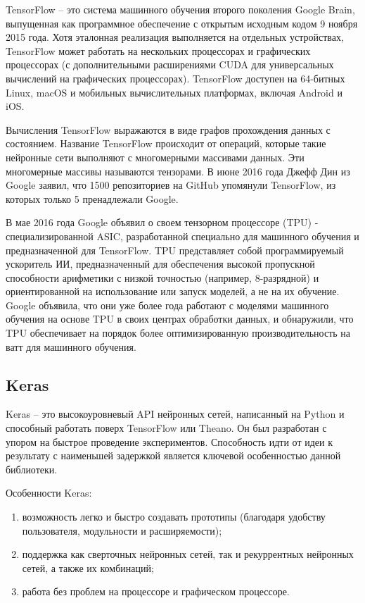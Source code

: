 TensorFlow -- это система машинного обучения второго поколения \linebreak Google Brain, выпущенная как программное обеспечение с открытым исходным кодом 9 ноября 2015 года. Хотя эталонная реализация выполняется на отдельных устройствах, TensorFlow может работать на нескольких процессорах и графических процессорах (с дополнительными расширениями CUDA для универсальных вычислений на графических процессорах). TensorFlow доступен на 64-битных Linux, macOS и мобильных вычислительных платформах, включая Android и iOS.

Вычисления TensorFlow выражаются в виде графов прохождения данных с состоянием. Название TensorFlow происходит от операций, которые такие нейронные сети выполняют с многомерными массивами данных. Эти многомерные массивы называются тензорами. В июне 2016 года Джефф Дин из Google заявил, что 1500 репозиториев на GitHub упомянули TensorFlow, из которых только 5 пренадлежали Google.

В мае 2016 года Google объявил о своем тензорном процессоре (TPU) - специализированной ASIC, разработанной специально для машинного обучения и предназначенной для TensorFlow. TPU представляет собой программируемый ускоритель ИИ, предназначенный для обеспечения высокой пропускной способности арифметики с низкой точностью (например, 8-разрядной) и ориентированной на использование или запуск моделей, а не на их обучение. Google объявила, что они уже более года работают с моделями машинного обучения на основе TPU в своих центрах обработки данных, и обнаружили, что TPU обеспечивает на порядок более оптимизированную производительность на ватт для машинного обучения.

\subsection{Keras}
\label{sec:development:keras}

Keras -- это высокоуровневый API нейронных сетей, написанный на \linebreak Python и способный работать поверх TensorFlow или Theano. Он был разработан с упором на быстрое проведение экспериментов. Способность идти от идеи к результату с наименьшей задержкой является ключевой особенностью данной библиотеки.

Особенности Keras:
\begin{enumerate}
  \item возможность легко и быстро создавать прототипы (благодаря удобству пользователя, модульности и расширяемости);
  \item поддержка как сверточных нейронных сетей, так и рекуррентных нейронных сетей, а также их комбинаций;
  \item работа без проблем на процессоре и графическом процессоре.
\end{enumerate}

